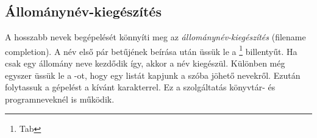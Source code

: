 \subsection{Állománynév-kiegészítés}
A hosszabb nevek begépelését könnyíti meg az \emph{állománynév-kiegészítés} (filename completion). A név első pár betűjének beírása után üssük le a \Tab\footnote{Tab} billentyűt. Ha csak egy állomány neve kezdődik így, akkor a név kiegészül. Különben még egyszer üssük le a \Tab-ot, hogy egy listát kapjunk a szóba jöhető nevekről. Ezután folytassuk a gépelést a kívánt karakterrel. Ez a szolgáltatás könyvtár- és programneveknél is működik.



